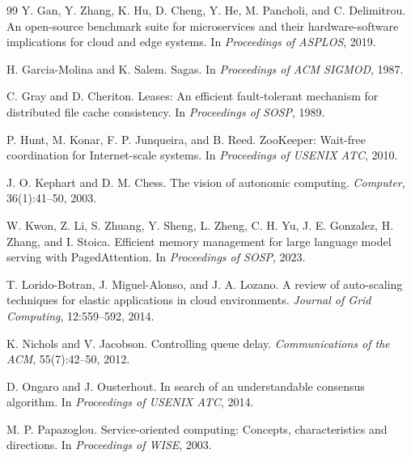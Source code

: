 \documentclass[5p,times]{elsarticle}
\begin{document}
\begin{thebibliography}{99}
Y. Gan, Y. Zhang, K. Hu, D. Cheng, Y. He, M. Pancholi, and C. Delimitrou.
\newblock An open-source benchmark suite for microservices and their hardware-software implications for cloud and edge systems.
\newblock In \emph{Proceedings of ASPLOS}, 2019.

H. Garcia-Molina and K. Salem.
\newblock Sagas.
\newblock In \emph{Proceedings of ACM SIGMOD}, 1987.

C. Gray and D. Cheriton.
\newblock Leases: An efficient fault-tolerant mechanism for distributed file cache consistency.
\newblock In \emph{Proceedings of SOSP}, 1989.

P. Hunt, M. Konar, F. P. Junqueira, and B. Reed.
\newblock ZooKeeper: Wait-free coordination for Internet-scale systems.
\newblock In \emph{Proceedings of USENIX ATC}, 2010.

J. O. Kephart and D. M. Chess.
\newblock The vision of autonomic computing.
\newblock \emph{Computer}, 36(1):41--50, 2003.

W. Kwon, Z. Li, S. Zhuang, Y. Sheng, L. Zheng, C. H. Yu, J. E. Gonzalez, H. Zhang, and I. Stoica.
\newblock Efficient memory management for large language model serving with PagedAttention.
\newblock In \emph{Proceedings of SOSP}, 2023.

T. Lorido-Botran, J. Miguel-Alonso, and J. A. Lozano.
\newblock A review of auto-scaling techniques for elastic applications in cloud environments.
\newblock \emph{Journal of Grid Computing}, 12:559--592, 2014.

K. Nichols and V. Jacobson.
\newblock Controlling queue delay.
\newblock \emph{Communications of the ACM}, 55(7):42--50, 2012.

D. Ongaro and J. Ousterhout.
\newblock In search of an understandable consensus algorithm.
\newblock In \emph{Proceedings of USENIX ATC}, 2014.

M. P. Papazoglou.
\newblock Service-oriented computing: Concepts, characteristics and directions.
\newblock In \emph{Proceedings of WISE}, 2003.


\end{thebibliography}
\end{document}
